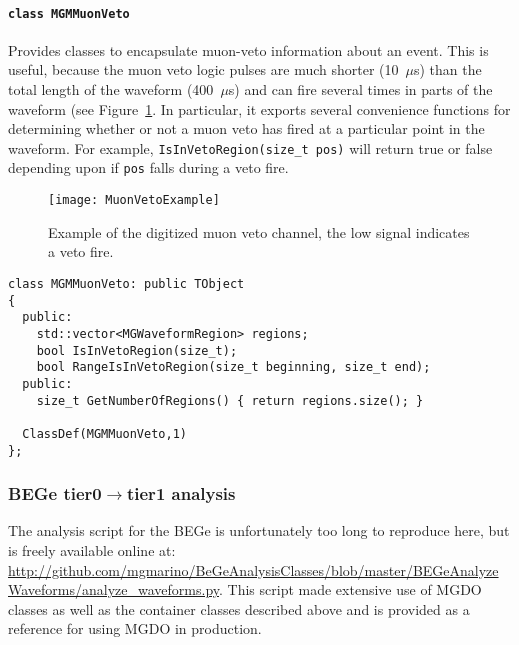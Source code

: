 				\paragraph{\lstinline!class MGMMuonVeto!}
Provides classes to encapsulate muon-veto information about an event.  This is useful, because the muon veto logic pulses are much shorter (10~$\mu$s) than the total length of the waveform (400~$\mu$s) and can fire several times in parts of the waveform (see Figure~\ref{fig:MuonVetoExample}.  In particular, it exports several convenience functions
for determining whether or not a muon veto has fired at a particular point in the waveform.  For example, \lstinline!IsInVetoRegion(size_t pos)! will return true or false depending upon if \lstinline!pos! falls during a veto fire.
					\begin{figure}
						\centering
						\texttt{[image: MuonVetoExample]}
						\caption[Example of the digitized muon veto channel.]
						{Example of the digitized muon veto channel, the low signal indicates a veto fire.}
						\label{fig:MuonVetoExample}
					\end{figure}
					\begin{lstlisting}
class MGMMuonVeto: public TObject
{
  public:
    std::vector<MGWaveformRegion> regions;
    bool IsInVetoRegion(size_t);
    bool RangeIsInVetoRegion(size_t beginning, size_t end);
  public:
    size_t GetNumberOfRegions() { return regions.size(); }
    
  ClassDef(MGMMuonVeto,1)
};
					\end{lstlisting}		
			\subsubsection{BEGe tier0$\to$tier1 analysis}	
The analysis script for the BEGe is unfortunately too long to reproduce here, but is freely available online at:
\url{http://github.com/mgmarino/BeGeAnalysisClasses/blob/master/BEGeAnalyzeWaveforms/analyze_waveforms.py}.  This 
script made extensive use of MGDO classes as well as the container classes described above and is provided as a reference
for using MGDO in production.
					
